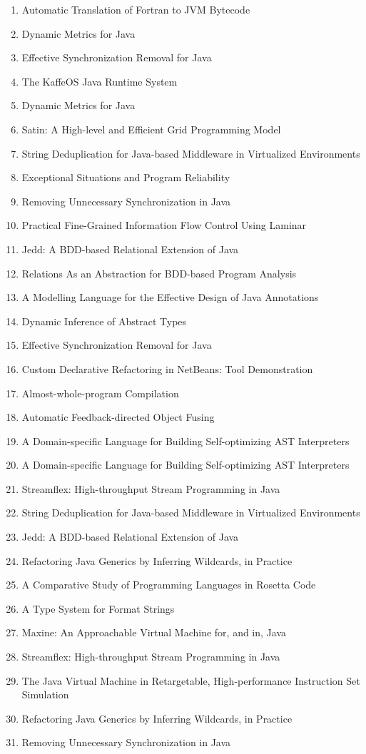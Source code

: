 \begin{enumerate}
\item Automatic Translation of Fortran to JVM Bytecode
\item Dynamic Metrics for Java
\item Effective Synchronization Removal for Java
\item The KaffeOS Java Runtime System
\item Dynamic Metrics for Java
\item Satin: A High-level and Efficient Grid Programming Model
\item String Deduplication for Java-based Middleware in Virtualized Environments
\item Exceptional Situations and Program Reliability
\item Removing Unnecessary Synchronization in Java
\item Practical Fine-Grained Information Flow Control Using Laminar
\item Jedd: A BDD-based Relational Extension of Java
\item Relations As an Abstraction for BDD-based Program Analysis
\item A Modelling Language for the Effective Design of Java Annotations
\item Dynamic Inference of Abstract Types
\item Effective Synchronization Removal for Java
\item Custom Declarative Refactoring in NetBeans: Tool Demonstration
\item Almost-whole-program Compilation
\item Automatic Feedback-directed Object Fusing
\item A Domain-specific Language for Building Self-optimizing AST Interpreters
\item A Domain-specific Language for Building Self-optimizing AST Interpreters
\item Streamflex: High-throughput Stream Programming in Java
\item String Deduplication for Java-based Middleware in Virtualized Environments
\item Jedd: A BDD-based Relational Extension of Java
\item Refactoring Java Generics by Inferring Wildcards, in Practice
\item A Comparative Study of Programming Languages in Rosetta Code
\item A Type System for Format Strings
\item Maxine: An Approachable Virtual Machine for, and in, Java
\item Streamflex: High-throughput Stream Programming in Java
\item The Java Virtual Machine in Retargetable, High-performance Instruction Set Simulation
\item Refactoring Java Generics by Inferring Wildcards, in Practice
\item Removing Unnecessary Synchronization in Java
\end{enumerate}

